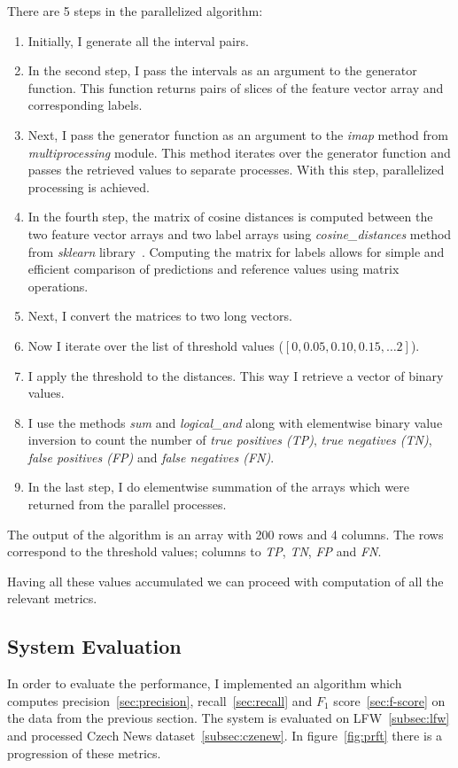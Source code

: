 There are 5 steps in the parallelized algorithm:
\begin{enumerate}
    \item Initially, I generate all the interval pairs.
    \item In the second step, I pass the intervals as an argument to the generator function.
    This function returns pairs of slices of the feature vector array and corresponding labels.
    \item Next, I pass the generator function as an argument to the \textit{imap} method from \textit{multiprocessing}
    module.
    This method iterates over the generator function and passes the retrieved values to separate processes.
    With this step, parallelized processing is achieved.
    \item In the fourth step, the matrix of cosine distances is computed between the two feature vector arrays
    and two label arrays using \textit{cosine\_distances} method from \textit{sklearn} library~\cite{scikit-learn}.
    Computing the matrix for labels allows for simple and efficient comparison of predictions and reference
    values using matrix operations.
    \item Next, I convert the matrices to two long vectors.
    \item Now I iterate over the list of threshold values ($\left[ 0, 0.05, 0.10, 0.15, \ldots 2 \right]$).
    \item I apply the threshold to the distances.
    This way I retrieve a vector of binary values.
    \item I use the methods \textit{sum} and \textit{logical\_and} along with elementwise binary value inversion to
    count the number of \textit{true positives (TP)}, \textit{true negatives (TN)}, \textit{false positives (FP)} and
    \textit{false negatives (FN)}.
    \item In the last step, I do elementwise summation of the arrays which were returned from the parallel processes.
\end{enumerate}

The output of the algorithm is an array with 200 rows and 4 columns.
The rows correspond to the threshold values; columns to \textit{TP}, \textit{TN}, \textit{FP} and \textit{FN}.

Having all these values accumulated we can proceed with computation of all the relevant metrics.

\subsection{System Evaluation}\label{subsec:syseval}
In order to evaluate the performance, I implemented an algorithm which computes precision~\ref{sec:precision},
recall~\ref{sec:recall} and $F_1$ score~\ref{sec:f-score} on the data from the previous section.
The system is evaluated on LFW~\ref{subsec:lfw} and processed Czech News dataset~\ref{subsec:czenew}.
In figure~\ref{fig:prft} there is a progression of these metrics.

